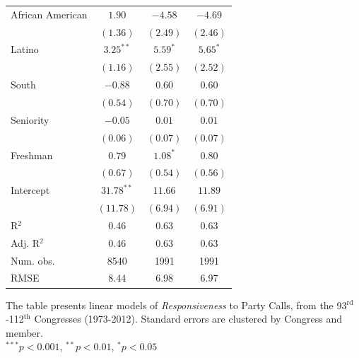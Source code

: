 \documentclass[12pt]{article}
\begin{document}
\begin{table}[!htbp]
\begin{threeparttable}
\begin{tabular}{l c c c }
African American      & $1.90$       & $-4.58$      & $-4.69$       \\
                      & $(1.36)$     & $(2.49)$     & $(2.46)$      \\
Latino                & $3.25^{**}$  & $5.59^{*}$   & $5.65^{*}$    \\
                      & $(1.16)$     & $(2.55)$     & $(2.52)$      \\
South                 & $-0.88$      & $0.60$       & $0.60$        \\
                      & $(0.54)$     & $(0.70)$     & $(0.70)$      \\
Seniority             & $-0.05$      & $0.01$       & $0.01$        \\
                      & $(0.06)$     & $(0.07)$     & $(0.07)$      \\
Freshman              & $0.79$       & $1.08^{*}$   & $0.80$        \\
                      & $(0.67)$     & $(0.54)$     & $(0.56)$      \\
Intercept             & $31.78^{**}$ & $11.66$      & $11.89$       \\
                      & $(11.78)$    & $(6.94)$     & $(6.91)$      \\
\hline
R$^2$                 & 0.46         & 0.63         & 0.63          \\
Adj. R$^2$            & 0.46         & 0.63         & 0.63          \\
Num. obs.             & 8540         & 1991         & 1991          \\
RMSE                  & 8.44         & 6.98         & 6.97          \\
\hline

\end{tabular}
\begin{tablenotes}
   \item
   The table presents linear models of \textit{Responsiveness} to Party Calls,
   from the 93$^{\text{rd}}$-112$^{\text{th}}$ Congresses (1973-2012).
  Standard errors are clustered by Congress and member.\\
   $^{***}p<0.001$, $^{**}p<0.01$, $^*p<0.05$
 \end{tablenotes}
\end{threeparttable}
\end{table}
\end{document}
